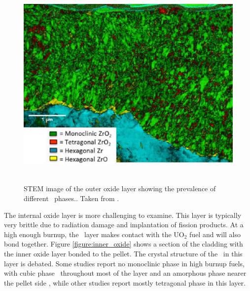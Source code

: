 \begin{figure}[htp]
\centering
\includegraphics[height=10.5cm]{images/outer_oxide.png}
\caption[STEM image of the outer oxide layer showing the prevalence of different \zirconia\ phases.]{STEM image of the outer oxide layer showing the prevalence of different \zirconia\ phases.. Taken from \cite{Hu2016}.}
\label{figure:outer_oxide}
\end{figure}

The internal oxide layer is more challenging to examine. This layer is typically very brittle due to radiation damage and implantation of fission products. At a high enough burnup, the \zirconia\ layer makes contact with the UO$_{2}$ fuel and will also bond together. Figure \ref{figure:inner_oxide} shows a section of the cladding with the inner oxide layer bonded to the pellet. The crystal structure of the \zirconia\ in this layer is debated. Some studies report no monoclinic phase in high burnup fuels, with cubic phase \zirconia\ throughout most of the layer and an amorphous phase nearer the pellet side \cite{Nogita1997}, while other studies report mostly tetragonal phase in this layer. 

